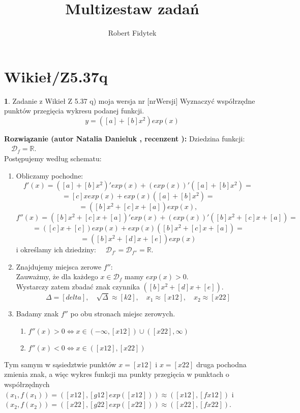 \documentclass[12pt, a4paper]{article}
\title{Multizestaw zadań}
\author{Robert Fidytek}
\date{}
\theoremstyle{definition} %
\newtheorem{zad}{}
\newcommand{\kategoria}[1]{\section{#1}} %
\newcommand{\zadStart}[1]{\begin{zad}#1\newline} %
\newcommand{\zadStop}{\end{zad}}   %
\newcommand{\rozwStart}[2]{\noindent \textbf{Rozwiązanie (autor #1 , recenzent #2): }\newline} %
\newcommand{\rozwStop}{\newline}                                            %
\begin{document}
\maketitle

\kategoria{Wikieł/Z5.37q}

\zadStart{Zadanie z Wikieł Z 5.37 q) moja wersja nr [nrWersji]}
Wyznaczyć współrzędne punktów przegięcia wykresu podanej funkcji.
$$y = ([a] + [b]x^2) exp(x)$$
\zadStop

\rozwStart{Natalia Danieluk}{}
Dziedzina funkcji: $\quad \mathcal{D}_f=\mathbb{R}$. \\
Postępujemy według schematu:
\begin{enumerate}
\item Obliczamy pochodne: 
$$f'(x) = ([a] + [b]x^2)' exp(x) + (exp(x))'([a] + [b]x^2) = $$
$$= [c]x exp(x) + exp(x)([a] + [b]x^2) = $$
$$= ([b]x^2 + [c]x + [a])exp(x), $$ 
$$f''(x) = ([b]x^2 + [c]x + [a])'exp(x) + (exp(x))'([b]x^2 + [c]x + [a]) = $$
$$= ([c]x + [c])exp(x) + exp(x)([b]x^2 + [c]x + [a]) = $$
$$= ([b]x^2 + [d]x + [e])exp(x)$$
i określamy ich dziedziny: $\quad \mathcal{D}_{f'}=\mathcal{D}_{f''}=\mathbb{R}$. \\
\item Znajdujemy miejsca zerowe $f''$: \\
Zauważmy, że dla każdego $x \in \mathcal{D}_f$ mamy $exp(x) > 0$. \\
Wystarczy zatem zbadać znak czynnika $([b]x^2 + [d]x + [e])$. \\
$$\Delta = [delta], \quad \sqrt{\Delta} \approx [k2], \quad x_1 \approx [x12], \quad x_2 \approx [x22]$$
\item Badamy znak $f''$ po obu stronach miejsc zerowych. \\
	\begin{enumerate}
	\item $f''(x) > 0 \Leftrightarrow x \in (-\infty,[x12]) \cup ([x22],\infty)$\\
	\item $f''(x) < 0 \Leftrightarrow x \in ([x12],[x22])$
	\end{enumerate}
\end{enumerate}
Tym samym w sąsiedztwie punktów $x=[x12]$ i $x=[x22]$ druga pochodna zmienia znak, a więc wykres funkcji ma punkty przegięcia w punktach o współrzędnych $(x_1,f(x_1)) = ([x12],[g12] exp([x12])) \approx ([x12],[fx12])$ i $(x_2,f(x_2)) = ([x22],[g22] exp([x22])) \approx ([x22],[fx22])$.
\rozwStop
\end{document}
